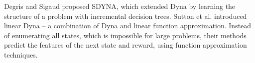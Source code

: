 


Degris and Sigaud \cite{ApproxTree} proposed SDYNA, which extended Dyna \cite{Dyna} by
learning the structure of a problem with incremental decision trees.
Sutton et al. \cite{ApproxDyna} introduced linear Dyna -- a combination 
of Dyna and linear function approximation. 
Instead of enumerating all states, which is impossible for large problems,
their methods predict the features of the next state and reward, using function approximation
techniques. 


